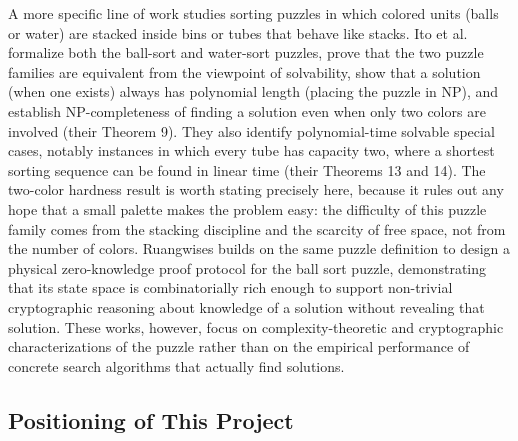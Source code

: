 \documentclass[letterpaper]{article}
\begin{document}
A more specific line of work studies sorting puzzles in which colored
units (balls or water) are stacked inside bins or tubes that behave like
stacks. Ito et al.\ \cite{ito2023} formalize both the ball-sort and
water-sort puzzles, prove that the two puzzle families are equivalent from
the viewpoint of solvability, show that a solution (when one exists)
always has polynomial length (placing the puzzle in NP), and establish
NP-completeness of finding a solution even when only two colors are involved
(their Theorem 9). They also identify polynomial-time solvable special cases,
notably instances in which every tube has capacity two, where a shortest
sorting sequence can be found in linear time (their Theorems 13 and 14). The
two-color hardness result is worth stating precisely here, because it rules out
any hope that a small palette makes the problem easy: the difficulty of this
puzzle family comes from the stacking discipline and the scarcity of free
space, not from the number of colors.
Ruangwises \cite{ruangwises2023} builds on the same puzzle
definition to design a physical zero-knowledge proof protocol for the ball
sort puzzle, demonstrating that its state space is combinatorially rich
enough to support non-trivial cryptographic reasoning about knowledge of a
solution without revealing that solution. These works, however, focus on
complexity-theoretic and cryptographic characterizations of the puzzle
rather than on the empirical performance of concrete search algorithms
that actually find solutions.

\subsection{Positioning of This Project}
\end{document}
